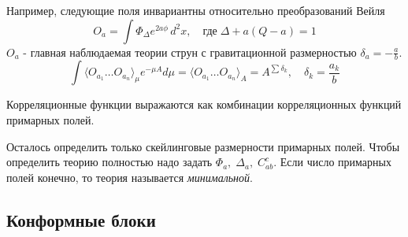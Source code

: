 \documentclass[a4paper,12pt]{article}
\theoremstyle{definition} \newtheorem{Def}{Definition}
\begin{document}
Например, следующие поля инвариантны относительно преобразований Вейля
\begin{equation}
  \label{eq:68}
  O_a=\int \Phi_{\Delta}e^{2a\phi}\,d^2x,\quad \mbox{где}\;\Delta+a(Q-a)=1
\end{equation}
$O_a$ - главная наблюдаемая теории струн с гравитационной размерностью $\delta_a=-\frac{a}{b}$.
\begin{equation}
  \label{eq:69}
  \int\langle O_{a_1}\dots O_{a_n}\rangle_{\mu} e^{-\mu A}d\mu=\langle O_{a_1}\dots O_{a_n}\rangle_{A}=A^{\sum \delta_k},\quad \delta_k=\frac{a_k}{b}
\end{equation}

Корреляционные функции выражаются как комбинации корреляционных функций примарных полей.

Осталось определить только скейлинговые размерности примарных полей. Чтобы определить теорию полностью надо задать $\Phi_a,\; \Delta_a,\; C^c_{ab}$. Если число примарных полей конечно, то теория называется {\it минимальной}.

\subsection{Конформные блоки}
\label{sec:conformal-blocks}
\end{document}
